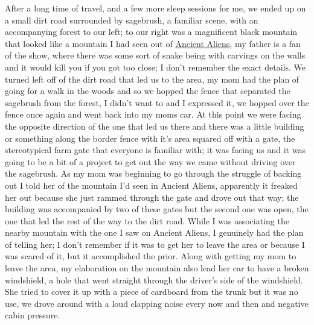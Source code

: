 \documentclass[12pt]{article}
\begin{document}
After a long time of travel, and a few more sleep sessions for me, we ended up
on a small dirt road surrounded by sagebrush, a familiar scene, with an
accompanying forest to our left; to our right was a magnificent black mountain
that looked like a mountain I had seen out of
{\color{blue}\underline{\href{https://www.history.com/shows/ancient-aliens}
{Ancient Aliens}}}, my father is a fan of the show, where there was some sort
of snake being with carvings on the walls and it would kill you if you got too
close; I don't remember the exact details. We turned left off of the dirt road
that led us to the area, my mom had the plan of going for a walk in the woods
and so we hopped the fence that separated the sagebrush from the forest, I
didn't want to and I expressed it, we hopped over the fence once again and went
back into my moms car. At this point we were facing the opposite direction of
the one that led us there and there was a little building or something along
the border fence with it's area squared off with a gate, the stereotypical farm
gate that everyone is familiar with; it was facing us and it was going to be a
bit of a project to get out the way we came without driving over the sagebrush.
As my mom was beginning to go through the struggle of backing out I told her of
the mountain I'd seen in Ancient Aliens, apparently it freaked her out because
she just rammed through the gate and drove out that way; the building was
accompanied by two of these gates but the second one was open, the one that led
the rest of the way to the dirt road. While I was associating the nearby
mountain with the one I saw on Ancient Aliens, I genuinely had the plan of
telling her; I don't remember if it was to get her to leave the area or because
I was scared of it, but it accomplished the prior. Along with getting my mom to
leave the area, my elaboration on the mountain also lead her car to have a
broken windshield, a hole that went straight through the driver's side of the
windshield. She tried to cover it up with a piece of cardboard from the trunk
but it was no use, we drove around with a loud clapping noise every now and
then and negative cabin pressure.
\end{document}
